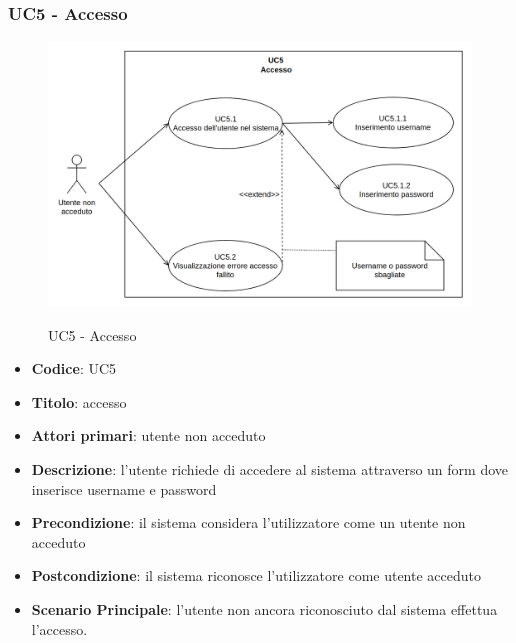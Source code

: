 \subsubsection{UC5 - Accesso}
		\begin{figure}[H]
			\centering
				\includegraphics[width=\columnwidth]{img/UC5.png}\\
			\caption{UC5 - Accesso}
		\end{figure}
	\begin{itemize}
		\item \textbf{Codice}: UC5
		\item \textbf{Titolo}: accesso
		\item \textbf{Attori primari}: utente non acceduto
		\item \textbf{Descrizione}: l'utente richiede di accedere al sistema attraverso un form dove inserisce username e password
		\item \textbf{Precondizione}: il sistema considera l’utilizzatore come un utente non acceduto
		\item \textbf{Postcondizione}: il sistema riconosce l'utilizzatore come utente acceduto
		\item \textbf{Scenario Principale}: l'utente non ancora riconosciuto dal sistema effettua l'accesso.
	\end{itemize}
	
